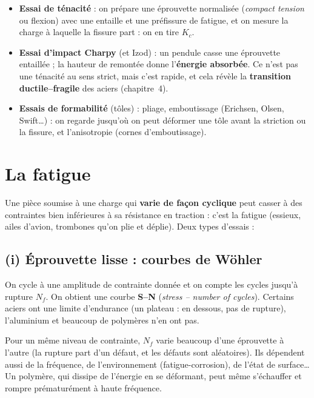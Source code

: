 \begin{itemize}
  \item \textbf{Essai de ténacité} : on prépare une éprouvette normalisée (\emph{compact
        tension} ou flexion) avec une entaille et une préfissure de fatigue, et on mesure la
        charge à laquelle la fissure part : on en tire $K_c$.
  \item \textbf{Essai d'impact Charpy} (et Izod) : un pendule casse une éprouvette entaillée ;
        la hauteur de remontée donne l'\textbf{énergie absorbée}. Ce n'est pas une ténacité au
        sens strict, mais c'est rapide, et cela révèle la \textbf{transition ductile--fragile}
        des aciers (chapitre~4).
  \item \textbf{Essais de formabilité} (tôles) : pliage, emboutissage (Erichsen, Olsen,
        Swift\ldots) : on regarde jusqu'où on peut déformer une tôle avant la striction ou la
        fissure, et l'anisotropie (\og cornes\fg{} d'emboutissage).
\end{itemize}


\section{La fatigue}

Une pièce soumise à une charge qui \textbf{varie de façon cyclique} peut casser à des contraintes
bien inférieures à sa résistance en traction : c'est la fatigue (essieux, ailes d'avion,
trombones qu'on plie et déplie). Deux types d'essais :

\subsection*{(i) Éprouvette lisse : courbes de Wöhler}


On cycle à une amplitude de contrainte donnée et on compte les cycles jusqu'à rupture $N_f$. On
obtient une courbe \textbf{S--N} (\emph{stress -- number of cycles}). Certains aciers ont une
limite d'endurance (un plateau : en dessous, pas de rupture), l'aluminium et beaucoup de
polymères n'en ont pas.

\begin{warnbox}[title=Les résultats sont statistiques]
Pour un même niveau de contrainte, $N_f$ varie beaucoup d'une éprouvette à l'autre (la rupture
part d'un défaut, et les défauts sont aléatoires). Ils dépendent aussi de la fréquence, de
l'environnement (fatigue-corrosion), de l'état de surface\ldots{} Un polymère, qui dissipe de
l'énergie en se déformant, peut même s'échauffer et rompre prématurément à haute fréquence.
\end{warnbox}

